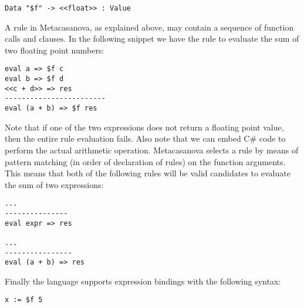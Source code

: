 \begin{lstlisting}
Data "$f" -> <<float>> : Value
\end{lstlisting}

\noindent
A rule in Metacasanova, as explained above, may contain a sequence of function calls and clauses. In the following snippet we have the rule to evaluate the sum of two floating point numbers:

\begin{lstlisting}
eval a => $f c
eval b => $f d
<<c + d>> => res
------------------------
eval (a + b) => $f res
\end{lstlisting}

\noindent
Note that if one of the two expressions does not return a floating point value, then the entire rule evaluation fails. Also note that we can embed C\# code to perform the actual arithmetic operation. Metacasanova selects a rule by means of pattern matching (in order of declaration of rules) on the function arguments. This means that both of the following rules will be valid candidates to evaluate the sum of two expressions:

\begin{lstlisting}
...
---------------
eval expr => res

...
----------------
eval (a + b) => res
\end{lstlisting} 

Finally the language supports expression bindings with the following syntax:

\begin{lstlisting}
x := $f 5
\end{lstlisting}

